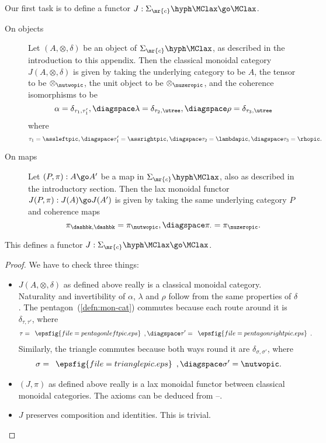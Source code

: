 Our first task is to define a functor $J: \Sigma_\mr{c}\hyph\MClax \go
\MClax$.

\begin{description}
\item[On objects] Let $(A, \otimes, \delta)$ be an object of
$\Sigma_\mr{c}\hyph\MClax$, as described in the introduction to this
appendix.  Then the classical monoidal category $J(A, \otimes, \delta)$ is
given by taking the underlying category to be $A$, the tensor to be
$\otimes_\nutwopic$, the unit object to be $\otimes_\nuzeropic$, and
the coherence isomorphisms to be
\[
\alpha = \delta_{\tau_1, \tau'_1},
\diagspace
\lambda = \delta_{\tau_2, \utree},
\diagspace
\rho = \delta_{\tau_3, \utree}
\]
where
\[
\tau_1 = \assleftpic,
\diagspace
\tau'_1 = \assrightpic,
\diagspace
\tau_2 = \lambdapic,
\diagspace
\tau_3 = \rhopic.
\]
%
\item[On maps] Let $(P, \pi): A \go A'$ be a map in
$\Sigma_\mr{c}\hyph\MClax$, also as described in the introductory section.
Then the lax monoidal functor $J(P,\pi): J(A) \go J(A')$ is given by taking
the same underlying category $P$ and coherence maps
\[
\pi_{\dashbk, \dashbk} = \pi_{\nutwopic},
\diagspace
\pi_\cdot = \pi_{\nuzeropic}.
\] 
\end{description}

\begin{lemma}
This defines a functor $J: \Sigma_\mr{c}\hyph\MClax \go \MClax$.
\end{lemma}

\begin{proof}
We have to check three things:
%
\begin{itemize}
\item $J(A, \otimes, \delta)$ as defined above really is a classical
monoidal category.  Naturality and invertibility of $\alpha$, $\lambda$ and
$\rho$ follow from the same properties of $\delta$.  The
pentagon~(\ref{defn:mon-cat}) commutes because each route around it is
$\delta_{\tau,\tau'}$, where
\[
\tau = 
\begin{array}{c}\epsfig{file=pentagonleftpic.eps}\end{array},
\diagspace
\tau' = 
\begin{array}{c}\epsfig{file=pentagonrightpic.eps}\end{array}.
\]
% 
Similarly, the triangle commutes because both ways round it are
$\delta_{\sigma,\sigma'}$, where
\[
\sigma = 
\begin{array}{c}\epsfig{file=trianglepic.eps}\end{array},
\diagspace
\sigma' = \nutwopic.
\]
\item $(J,\pi)$ as defined above really is a lax monoidal functor between
classical monoidal categories.  The axioms can be deduced from
--. 
\item $J$ preserves composition and identities.  This is trivial.%
\done
\end{itemize}
\end{proof}

